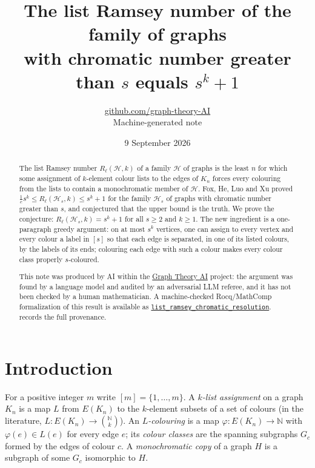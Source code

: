\documentclass[11pt,a4paper]{article}
\title{The list Ramsey number of the family of graphs\\ with chromatic number greater than $s$ equals $s^k+1$}
\author{\href{https://github.com/graph-theory-AI}{github.com/graph-theory-AI}\\[2pt] \normalsize Machine-generated note}
\date{9 September 2026}
\theoremstyle{plain}
\theoremstyle{definition}
\theoremstyle{remark}
\newcommand{\cH}{\mathcal H}
\newcommand{\N}{\mathbb N}
\newcommand{\Rl}{R_{\ell}}
\begin{document}
\maketitle


\begin{abstract}
The list Ramsey number $\Rl(\cH,k)$ of a family $\cH$ of graphs is the least $n$ for which some assignment of $k$-element colour lists to the edges of $K_n$ forces every colouring from the lists to contain a monochromatic member of $\cH$. Fox, He, Luo and Xu proved $\frac1e s^k\le\Rl(\cH_s,k)\le s^k+1$ for the family $\cH_s$ of graphs with chromatic number greater than $s$, and conjectured that the upper bound is the truth. We prove the conjecture: $\Rl(\cH_s,k)=s^k+1$ for all $s\ge2$ and $k\ge1$. The new ingredient is a one-paragraph greedy argument: on at most $s^k$ vertices, one can assign to every vertex and every colour a label in $[s]$ so that each edge is separated, in one of its listed colours, by the labels of its ends; colouring each edge with such a colour makes every colour class properly $s$-coloured.

\medskip\noindent\small
This note was produced by AI within the \href{https://github.com/graph-theory-AI/Graph-Theory-LLM-Proofs}{Graph Theory AI} project:
the argument was found by a language model and audited by an adversarial LLM
referee, and it has not been checked by a human mathematician.
A machine-checked Rocq/MathComp formalization of this result is available as
\href{https://github.com/LLM4Rocq/graph-theory-rocq/blob/main/extremal-graph-theory/theories/applications/list_ramsey_graph.v}{\texttt{list\_ramsey\_chromatic\_resolution}}.
 records the full provenance.

\end{abstract}

\section{Introduction}\label{sec:intro}

For a positive integer $m$ write $[m]=\{1,\dots,m\}$. A \emph{$k$-list assignment} on a graph $K_n$ is a map $L$ from $E(K_n)$ to the $k$-element subsets of a set of colours (in the literature, $L:E(K_n)\to\binom{\N}{k}$). An \emph{$L$-colouring} is a map $\varphi:E(K_n)\to\N$ with $\varphi(e)\in L(e)$ for every edge $e$; its \emph{colour classes} are the spanning subgraphs $G_c$ formed by the edges of colour $c$. A \emph{monochromatic copy} of a graph $H$ is a subgraph of some $G_c$ isomorphic to $H$.
\end{document}
